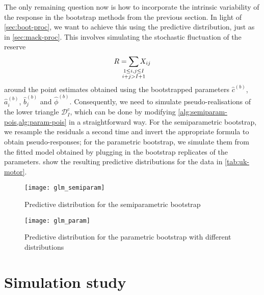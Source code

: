 \documentclass[a4paper]{book}
\begin{document}
The only remaining question now is how to incorporate the intrinsic variability of the response in the bootstrap methods from the previous section. In light of \cref{sec:boot-proc}, we want to achieve this using the predictive distribution, just as in \cref{sec:mack-proc}. This involves simulating the stochastic fluctuation of the reserve
\begin{equation}
  R = \sum_{\mathclap{\substack{1 \leq i, j \leq I \mathstrut \\ i + j > I + 1}}} X_{ij}
\end{equation}
around the point estimates obtained using the bootstrapped parameters $\widehat{c}^{(b)}$, $\widehat{a}^{(b)}_i$, $\widehat{b}^{(b)}_j$ and $\widehat{\phi}^{(b)}$. Consequently, we need to simulate pseudo-realisations of the lower triangle $\mathcal{D}^c_I$, which can be done by modifying \cref{alg:semiparam-pois,alg:param-pois} in a straightforward way. For the semiparametric bootstrap, we resample the residuals a second time and invert the appropriate formula to obtain pseudo-responses; for the parametric bootstrap, we simulate them from the fitted model obtained by plugging in the bootstrap replicates of the parameters.  show the resulting predictive distributions for the data in \cref{tab:uk-motor}.

\begin{figure}[!p]
  \texttt{[image: glm\_semiparam]}
  \caption{Predictive distribution for the semiparametric bootstrap}
  \label{fig:odp-pred-dist-semiparam}
\end{figure}

\begin{figure}[!p]
  \texttt{[image: glm\_param]}
  \caption{Predictive distribution for the parametric bootstrap with different distributions}
  \label{fig:odp-pred-dist-param}
\end{figure}

\chapter{Simulation study} \label{chapter:sim}
\end{document}
